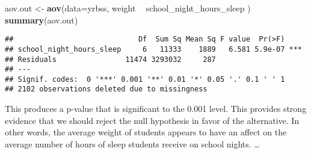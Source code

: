 \documentclass[
]{article}
\newenvironment{Shaded}{\begin{snugshade}}{\end{snugshade}}
\newcommand{\DataTypeTok}[1]{\textcolor[rgb]{0.13,0.29,0.53}{#1}}
\newcommand{\KeywordTok}[1]{\textcolor[rgb]{0.13,0.29,0.53}{\textbf{#1}}}
\newcommand{\NormalTok}[1]{#1}
\newcommand{\OperatorTok}[1]{\textcolor[rgb]{0.81,0.36,0.00}{\textbf{#1}}}
\newcommand{\StringTok}[1]{\textcolor[rgb]{0.31,0.60,0.02}{#1}}
\begin{document}
\begin{Shaded}
\begin{Highlighting}[]
\NormalTok{aov.out <-}\StringTok{ }\KeywordTok{aov}\NormalTok{(}\DataTypeTok{data=}\NormalTok{yrbss, weight }\OperatorTok{~}\StringTok{ }\NormalTok{school_night_hours_sleep )}
\KeywordTok{summary}\NormalTok{(aov.out)}
\end{Highlighting}
\end{Shaded}

\begin{verbatim}
##                             Df  Sum Sq Mean Sq F value  Pr(>F)    
## school_night_hours_sleep     6   11333    1889   6.581 5.9e-07 ***
## Residuals                11474 3293032     287                    
## ---
## Signif. codes:  0 '***' 0.001 '**' 0.01 '*' 0.05 '.' 0.1 ' ' 1
## 2102 observations deleted due to missingness
\end{verbatim}

This produces a p-value that is significant to the 0.001 level. This
provides strong evidence that we should reject the null hypothesis in
favor of the alternative. In other words, the average weight of students
appears to have an affect on the average number of hours of sleep
students receive on school nights. \ldots{}
\end{document}
